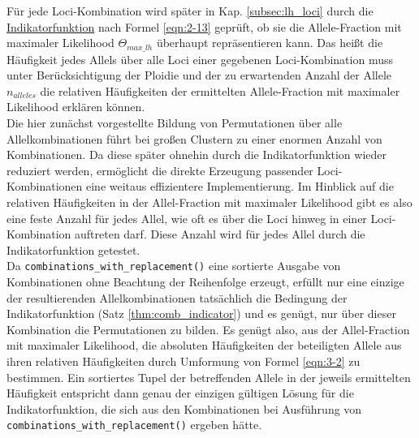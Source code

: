 \newpage
Für jede Loci-Kombination wird später in Kap. \ref{subsec:lh_loci} durch die \hyperref[schritt14a]{Indikatorfunktion\label{schritt14atxt}} nach Formel \eqref{eqn:2-13} geprüft, ob sie die Allele-Fraction mit maximaler Likelihood $\Theta_{max\_lh}$ überhaupt repräsentieren kann. Das heißt die Häufigkeit jedes Allels über alle Loci einer gegebenen Loci-Kombination muss unter Berücksichtigung der Ploidie und der zu erwartenden Anzahl der Allele $n_{alleles}$ die relativen Häufigkeiten der ermittelten Allele-Fraction mit maximaler Likelihood erklären können. \\

Die hier zunächst vorgestellte Bildung von Permutationen über alle Allelkombinationen führt bei großen Clustern zu einer enormen Anzahl von Kombinationen. Da diese später ohnehin durch die Indikatorfunktion wieder reduziert werden, ermöglicht die direkte Erzeugung passender Loci-Kombinationen eine weitaus effizientere Implementierung. Im Hinblick auf die relativen Häufigkeiten in der Allel-Fraction mit maximaler Likelihood gibt es also eine feste Anzahl für jedes Allel, wie oft es über die Loci hinweg in einer Loci-Kombination auftreten darf. Diese Anzahl wird für jedes Allel durch die Indikatorfunktion getestet.\\

Da \lstinline|combinations_with_replacement()| eine sortierte Ausgabe von Kombinationen ohne Beachtung der Reihenfolge erzeugt, erfüllt nur eine einzige der resultierenden Allelkombinationen tatsächlich die Bedingung der Indikatorfunktion (Satz  \ref{thm:comb_indicator}) und es genügt, nur über dieser Kombination die Permutationen zu bilden. Es genügt also, aus der Allel-Fraction mit maximaler Likelihood, die absoluten Häufigkeiten der beteiligten Allele aus ihren relativen Häufigkeiten durch Umformung von Formel \eqref{eqn:3-2} zu bestimmen. Ein sortiertes Tupel der betreffenden Allele in der jeweils ermittelten Häufigkeit entspricht dann genau der einzigen gültigen Lösung für die Indikatorfunktion, die sich aus den Kombinationen bei Ausführung von \lstinline|combinations_with_replacement()| ergeben hätte.\\

